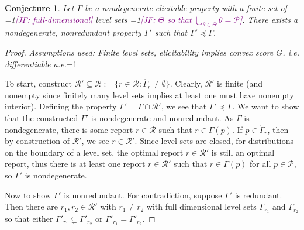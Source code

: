\documentclass[12pt]{article}
\newcommand{\Comments}{1}
\newcommand{\mynote}[2]{\ifnum\Comments=1\textcolor{#1}{#2}\fi}
\newcommand{\mytodo}[2]{\ifnum\Comments=1%
  \todo[linecolor=#1!80!black,backgroundcolor=#1,bordercolor=#1!80!black]{#2}\fi}
\newcommand{\raft}[1]{\mytodo{green!20!white}{RF: #1}}
\newcommand{\jessie}[1]{\mynote{purple}{[JF: #1]}}
\renewcommand{\P}{\mathcal{P}}
\newcommand{\R}{\mathcal{R}}
\newcommand{\inter}[1]{\mathring{#1}}%
\newtheorem{conjecture}{Conjecture}
\begin{document}
\begin{conjecture}\label{conj:gam-prime-exists}
	Let $\Gamma$ be a nondegenerate elicitable property with a finite set of \jessie{full-dimensional} level sets \jessie{$\Theta$ so that $\bigcup_{\theta \in \Theta}\theta = \P$}.
	There exists a nondegenerate, nonredundant property $\Gamma'$ such that $\Gamma' \preceq \Gamma$. 
\end{conjecture}
\begin{proof}
\emph{Assumptions used: Finite level sets, elicitability implies convex score $G$, i.e. differentiable a.e.}\raft{Confused by BR}

	To start, construct $\R' \subseteq \R := \{ r \in \R : \inter{\Gamma_r} \neq \emptyset \}$.
	Clearly, $\R'$ is finite (and nonempty since finitely many level sets implies at least one must have nonempty interior).
	Defining the property $\Gamma' = \Gamma\cap \R'$, we see that $\Gamma' \preceq \Gamma$.
	We want to show that the constructed $\Gamma'$ is nondegenerate and nonredundant.
	As $\Gamma$ is nondegenerate, there is some report $r \in \R$ such that $r \in \Gamma(p)$.
	If $p \in \inter{\Gamma}_r$, then by construction of $\R'$, we see $r \in \R'$.
	Since level sets are closed, for distributions on the boundary of a level set, the optimal report $r \in \R'$ is still an optimal report, thus there is at least one report $r \in \R'$ such that $r \in \Gamma(p)$ for all $p \in \P$, so $\Gamma'$ is nondegenerate. 

	
	
	Now to show $\Gamma'$ is nonredundant.
	For contradiction, suppose $\Gamma'$ is redundant.
	Then there are $r_1, r_2 \in \R'$ with $r_1 \neq r_2$ with full dimensional level sets $\Gamma_{r_1}$ and $\Gamma_{r_2}$ so that either $\Gamma'_{r_1} \subsetneq \Gamma'_{r_2}$ or $\Gamma'_{r_1} = \Gamma'_{r_2}$.
	

\end{proof}
\end{document}
